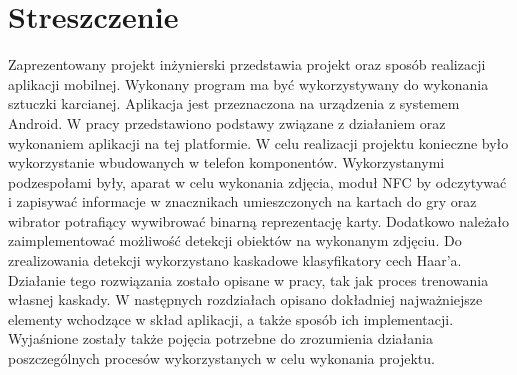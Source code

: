 \section*{Streszczenie}
Zaprezentowany projekt inżynierski przedstawia projekt oraz sposób realizacji aplikacji mobilnej. Wykonany program ma być wykorzystywany do wykonania sztuczki karcianej. Aplikacja jest przeznaczona na urządzenia z systemem Android. W pracy przedstawiono podstawy związane z działaniem oraz wykonaniem aplikacji na tej platformie. W celu realizacji projektu konieczne było wykorzystanie wbudowanych w telefon komponentów. Wykorzystanymi podzespołami były, aparat w celu wykonania zdjęcia, moduł NFC by odczytywać i zapisywać informacje w znacznikach umieszczonych na kartach do gry oraz wibrator potrafiący wywibrować binarną reprezentację karty. Dodatkowo należało zaimplementować możliwość detekcji obiektów na wykonanym zdjęciu. Do zrealizowania detekcji wykorzystano kaskadowe klasyfikatory cech Haar'a. Działanie tego rozwiązania zostało opisane w pracy, tak jak proces trenowania własnej kaskady. W następnych rozdziałach opisano dokładniej najważniejsze elementy wchodzące w skład aplikacji, a także sposób ich implementacji. Wyjaśnione zostały także pojęcia potrzebne do zrozumienia działania poszczególnych procesów wykorzystanych w celu wykonania projektu. 
